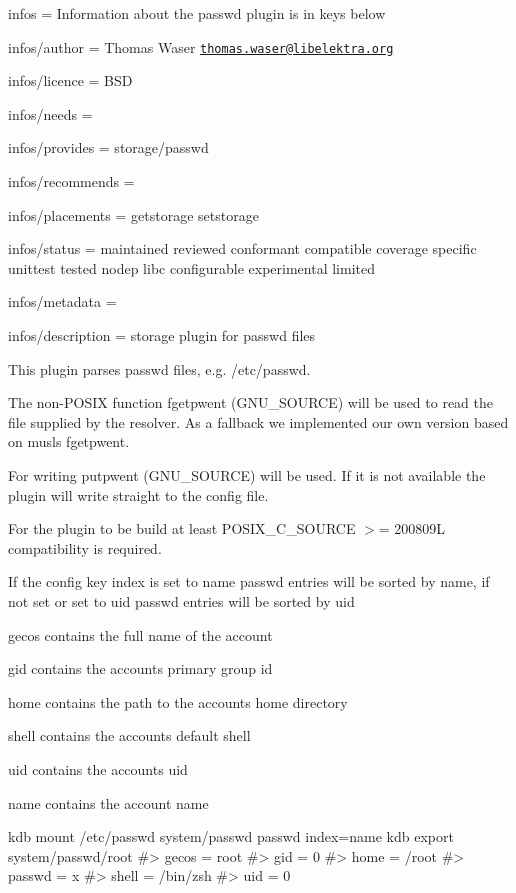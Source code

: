 
\begin{DoxyItemize}
\item infos = Information about the passwd plugin is in keys below
\item infos/author = Thomas Waser \href{mailto:thomas.waser@libelektra.org}{\tt thomas.\+waser@libelektra.\+org}
\item infos/licence = B\+SD
\item infos/needs =
\item infos/provides = storage/passwd
\item infos/recommends =
\item infos/placements = getstorage setstorage
\item infos/status = maintained reviewed conformant compatible coverage specific unittest tested nodep libc configurable experimental limited
\item infos/metadata =
\item infos/description = storage plugin for passwd files
\end{DoxyItemize}

This plugin parses {\ttfamily passwd} files, e.\+g. {\ttfamily /etc/passwd}.

The non-\/\+P\+O\+S\+IX function {\ttfamily fgetpwent} (G\+N\+U\+\_\+\+S\+O\+U\+R\+CE) will be used to read the file supplied by the resolver. As a fallback we implemented our own version based on musls {\ttfamily fgetpwent}.

For writing {\ttfamily putpwent} (G\+N\+U\+\_\+\+S\+O\+U\+R\+CE) will be used. If it is not available the plugin will write straight to the config file.

For the plugin to be build at least {\ttfamily P\+O\+S\+I\+X\+\_\+\+C\+\_\+\+S\+O\+U\+R\+CE $>$= 200809L} compatibility is required.

If the config key {\ttfamily index} is set to {\ttfamily name} passwd entries will be sorted by name, if not set or set to {\ttfamily uid} passwd entries will be sorted by uid


\begin{DoxyItemize}
\item {\ttfamily gecos} contains the full name of the account
\item {\ttfamily gid} contains the accounts primary group id
\item {\ttfamily home} contains the path to the accounts home directory
\item {\ttfamily shell} contains the accounts default shell
\item {\ttfamily uid} contains the accounts uid
\item {\ttfamily name} contains the account name
\end{DoxyItemize}


\begin{DoxyCode}
kdb mount /etc/passwd system/passwd passwd index=name
kdb export system/passwd/root
#> gecos = root
#> gid = 0
#> home = /root
#> passwd = x
#> shell = /bin/zsh
#> uid = 0
\end{DoxyCode}
 